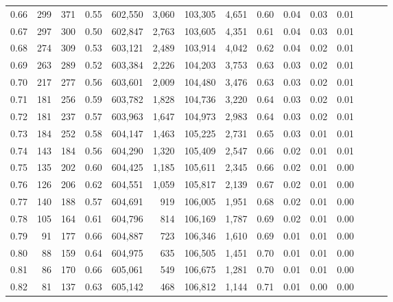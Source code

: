 \begin{tabular}{rrrrrrrrrrrrrrr}
0.66 &     299 &    371 &  0.55 &  602,550 &    3,060 &  103,305 &    4,651 &  0.60 &  0.04 &  0.03 &      0.01 \\
0.67 &     297 &    300 &  0.50 &  602,847 &    2,763 &  103,605 &    4,351 &  0.61 &  0.04 &  0.03 &      0.01 \\
0.68 &     274 &    309 &  0.53 &  603,121 &    2,489 &  103,914 &    4,042 &  0.62 &  0.04 &  0.02 &      0.01 \\
0.69 &     263 &    289 &  0.52 &  603,384 &    2,226 &  104,203 &    3,753 &  0.63 &  0.03 &  0.02 &      0.01 \\
0.70 &     217 &    277 &  0.56 &  603,601 &    2,009 &  104,480 &    3,476 &  0.63 &  0.03 &  0.02 &      0.01 \\
0.71 &     181 &    256 &  0.59 &  603,782 &    1,828 &  104,736 &    3,220 &  0.64 &  0.03 &  0.02 &      0.01 \\
0.72 &     181 &    237 &  0.57 &  603,963 &    1,647 &  104,973 &    2,983 &  0.64 &  0.03 &  0.02 &      0.01 \\
0.73 &     184 &    252 &  0.58 &  604,147 &    1,463 &  105,225 &    2,731 &  0.65 &  0.03 &  0.01 &      0.01 \\
0.74 &     143 &    184 &  0.56 &  604,290 &    1,320 &  105,409 &    2,547 &  0.66 &  0.02 &  0.01 &      0.01 \\
0.75 &     135 &    202 &  0.60 &  604,425 &    1,185 &  105,611 &    2,345 &  0.66 &  0.02 &  0.01 &      0.00 \\
0.76 &     126 &    206 &  0.62 &  604,551 &    1,059 &  105,817 &    2,139 &  0.67 &  0.02 &  0.01 &      0.00 \\
0.77 &     140 &    188 &  0.57 &  604,691 &      919 &  106,005 &    1,951 &  0.68 &  0.02 &  0.01 &      0.00 \\
0.78 &     105 &    164 &  0.61 &  604,796 &      814 &  106,169 &    1,787 &  0.69 &  0.02 &  0.01 &      0.00 \\
0.79 &      91 &    177 &  0.66 &  604,887 &      723 &  106,346 &    1,610 &  0.69 &  0.01 &  0.01 &      0.00 \\
0.80 &      88 &    159 &  0.64 &  604,975 &      635 &  106,505 &    1,451 &  0.70 &  0.01 &  0.01 &      0.00 \\
0.81 &      86 &    170 &  0.66 &  605,061 &      549 &  106,675 &    1,281 &  0.70 &  0.01 &  0.01 &      0.00 \\
0.82 &      81 &    137 &  0.63 &  605,142 &      468 &  106,812 &    1,144 &  0.71 &  0.01 &  0.00 &      0.00 \\

\end{tabular}
